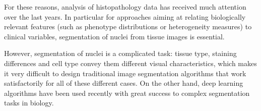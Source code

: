 \documentclass{article}
\begin{document}
For these reasons, analysis of histopathology data has received much
attention over the last years. In particular for approaches aiming at
relating biologically relevant features (such as phenotype
distributions or heterogeneity measures) to clinical variables,
segmentation of nuclei from tissue images is essential. 




However, segmentation of nuclei is a
complicated task: tissue type, staining differences and cell type
convey them different visual characteristics, which makes it very difficult to
design traditional image segmentation algorithms that work
satisfactorily for all of these different cases. On the other hand,
deep learning algorithms have been used recently with great success to
complex segmentation tasks in biology\cite{Ciresan2012,UNet}. 
\end{document}
